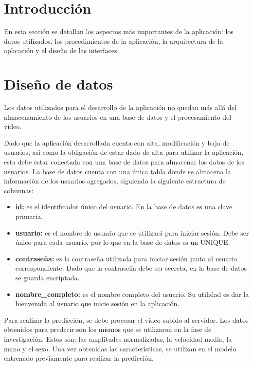 
\section{Introducción}
En esta sección se detallan los aspectos más importantes de la aplicación: los datos utilizados, los procedimientos de la aplicación, la arquitectura de la aplicación y el diseño de las interfaces.

\section{Diseño de datos}
Los datos utilizados para el desarrollo de la aplicación no quedan más allá del almacenamiento de los usuarios en una base de datos y el procesamiento del vídeo.

Dado que la aplicación desarrollada cuenta con alta, modificación y baja de usuarios, así como la obligación de estar dado de alta para utilizar la aplicación, esta debe estar conectada con una base de datos para almacenar los datos de los usuarios. La base de datos cuenta con una única tabla donde se almacena la información de los usuarios agregados, siguiendo la siguiente estructura de columnas:

\begin{itemize}
	\item \textbf{id:} es el identificador único del usuario. En la base de datos es una clave primaria.
	\item \textbf{usuario:} es el nombre de usuario que se utilizará para iniciar sesión. Debe ser único para cada usuario, por lo que en la base de datos es un UNIQUE.
	\item \textbf{contraseña:} es la contraseña utilizada para iniciar sesión junto al usuario correspondiente. Dado que la contraseña debe ser secreta, en la base de datos se guarda encriptada.
	\item \textbf{nombre\_completo:} es el nombre completo del usuario. Su utilidad es dar la bienvenida al usuario que inicie sesión en la aplicación.
\end{itemize}

Para realizar la predicción, se debe procesar el vídeo subido al servidor. Los datos obtenidos para predecir son los mismos que se utilizaron en la fase de investigación. Estos son: las amplitudes normalizadas, la velocidad media, la mano y el sexo. Una vez obtenidas las características, se utilizan en el modelo entrenado previamente para realizar la predicción.

